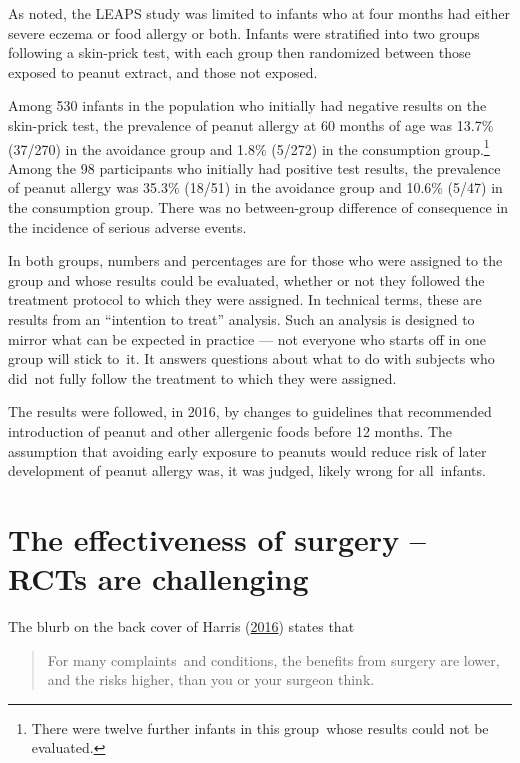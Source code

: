 \documentclass[
  10ptls,
  b5paper]{book}
\begin{document}
As noted, the LEAPS study was limited to infants who at four months had
either severe eczema or food allergy or both. Infants were stratified
into two groups following a skin-prick test, with each group then
randomized between those exposed to peanut extract, and those not
exposed.

Among 530 infants in the population who initially had negative results
on the skin-prick test, the prevalence of peanut allergy at 60 months of
age was 13.7\% (37/270) in the avoidance group and 1.8\% (5/272) in the
consumption group.\footnote{There were twelve further infants in this group~whose
  results could not be evaluated.} Among the 98 participants who
initially had positive test results, the prevalence of peanut allergy
was 35.3\% (18/51) in the avoidance group and 10.6\% (5/47) in the
consumption group. There was no between-group difference of consequence
in the incidence of serious adverse events.

In both groups, numbers and percentages are for those who were assigned
to the group and whose results could be evaluated, whether or not they
followed the treatment protocol to which they were assigned. In
technical terms, these are results from an ``intention to treat''
analysis. Such an analysis is designed to mirror what can be expected in
practice --- not everyone who starts off in one group will stick to~it.
It answers questions about what to do with subjects who did~not fully
follow the treatment to which they were assigned.

The results were followed, in 2016, by changes to guidelines that
recommended introduction of peanut and other allergenic foods before 12
months. The assumption that avoiding early exposure to peanuts would
reduce risk of later development of peanut allergy was, it was judged,
likely wrong for all~infants.

\hypertarget{the-effectiveness-of-surgery-rcts-are-challenging}{%
\section{The effectiveness of surgery -- RCTs are challenging}\label{the-effectiveness-of-surgery-rcts-are-challenging}}

The blurb on the back cover of Harris (\protect\hyperlink{ref-harris2016book}{2016}) states that

\begin{quote}
For many complaints~and conditions, the benefits from surgery are
lower, and the risks higher, than you or your surgeon think.
\end{quote}
\end{document}
